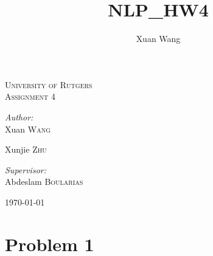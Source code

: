 \documentclass[12pt]{amsart}
\title{NLP_HW4}
\author{Xuan Wang}
\date{} %
\begin{document}
\begin{titlepage}

\begin{center}



\textsc{\LARGE University of Rutgers}\\[1.5cm]

\textsc{\Large Assignment 4}\\[0.5cm]


\begin{minipage}{0.4\textwidth}
\begin{flushleft} \large
\emph{Author:}\\
Xuan \textsc{Wang}

Xunjie \textsc{Zhu}
\end{flushleft}
\end{minipage}
\begin{minipage}{0.4\textwidth}
\begin{flushright} \large
\emph{Supervisor:} \\
Abdeslam  \textsc{Boularias}
\end{flushright}
\end{minipage}

\vfill

{\large \today}

\end{center}

\end{titlepage}

\section*{Problem 1}
\end{document}

